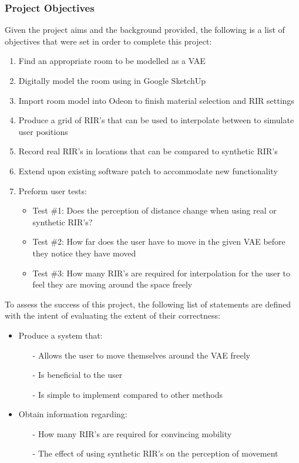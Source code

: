 \documentclass[../../main.tex]{subfiles}
\begin{document}
	\subsubsection{Project Objectives}
	\label{background:objectives}

		Given the project aims and the background provided, the following is a list of objectives that were set in order to complete this project:

		\begin{enumerate}
			\item Find an appropriate room to be modelled as a \ac{VAE} 
			\item Digitally model the room using in Google SketchUp
			\item Import room model into Odeon to finish material selection and \ac{RIR} settings
			\item Produce a grid of \ac{RIR}'s that can be used to interpolate between to simulate user positions
			\item Record real \ac{RIR}'s in locations that can be compared to synthetic \ac{RIR}'s
			\item Extend upon existing software patch to accommodate new functionality
			\item Preform user tests:
				\begin{itemize}
					\item Test \#1: Does the perception of distance change when using real or synthetic \ac{RIR}'s?
					\item Test \#2: How far does the user have to move in the given \ac{VAE} before they notice they have moved 
					\item Test \#3: How many \ac{RIR}'s are required for interpolation for the user to feel they are moving around the space freely
				\end{itemize}
			\end{enumerate}



	To assess the success of this project, the following list of statements are defined with the intent of evaluating the extent of their correctness:

	\begin{itemize}
		\item Produce a system that:
	\begin{itemize}
		\item[-] Allows the user to move themselves around the \ac{VAE} freely
		\item[-] Is beneficial to the user
		\item[-] Is simple to implement compared to other methods
	\end{itemize}

		\item Obtain information regarding:
		\begin{itemize}
			\item[-] How many \ac{RIR}'s are required for convincing mobility
			\item[-] The effect of using synthetic \ac{RIR}'s on the perception of movement
		\end{itemize}
	\end{itemize}
\end{document}
